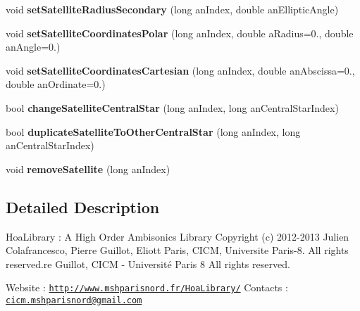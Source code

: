 \begin{DoxyCompactItemize}
\item 
\hypertarget{class_planetary_system_aa2f7ed32aae14ce1fb69e93de431439e}{void {\bfseries set\-Satellite\-Radius\-Secondary} (long an\-Index, double an\-Elliptic\-Angle)}\label{class_planetary_system_aa2f7ed32aae14ce1fb69e93de431439e}

\item 
\hypertarget{class_planetary_system_a2fc534b513016f11bde9fae1aa283957}{void {\bfseries set\-Satellite\-Coordinates\-Polar} (long an\-Index, double a\-Radius=0., double an\-Angle=0.)}\label{class_planetary_system_a2fc534b513016f11bde9fae1aa283957}

\item 
\hypertarget{class_planetary_system_a4f2004bcd09122c7fc91fbb981c09411}{void {\bfseries set\-Satellite\-Coordinates\-Cartesian} (long an\-Index, double an\-Abscissa=0., double an\-Ordinate=0.)}\label{class_planetary_system_a4f2004bcd09122c7fc91fbb981c09411}

\item 
\hypertarget{class_planetary_system_a56360b443eb55848560b510ac17ab0e2}{bool {\bfseries change\-Satellite\-Central\-Star} (long an\-Index, long an\-Central\-Star\-Index)}\label{class_planetary_system_a56360b443eb55848560b510ac17ab0e2}

\item 
\hypertarget{class_planetary_system_a2c830af8903995377007530f71036304}{bool {\bfseries duplicate\-Satellite\-To\-Other\-Central\-Star} (long an\-Index, long an\-Central\-Star\-Index)}\label{class_planetary_system_a2c830af8903995377007530f71036304}

\item 
\hypertarget{class_planetary_system_a7458e3d75f4acb8c1c45787d0bede571}{void {\bfseries remove\-Satellite} (long an\-Index)}\label{class_planetary_system_a7458e3d75f4acb8c1c45787d0bede571}

\end{DoxyCompactItemize}


\subsection{Detailed Description}
Hoa\-Library \-: A High Order Ambisonics Library Copyright (c) 2012-\/2013 Julien Colafrancesco, Pierre Guillot, Eliott Paris, C\-I\-C\-M, Universite Paris-\/8. All rights reserved.\-re Guillot, C\-I\-C\-M -\/ Université Paris 8 All rights reserved.

Website \-: \href{http://www.mshparisnord.fr/HoaLibrary/}{\tt http\-://www.\-mshparisnord.\-fr/\-Hoa\-Library/} Contacts \-: \href{mailto:cicm.mshparisnord@gmail.com}{\tt cicm.\-mshparisnord@gmail.\-com}

